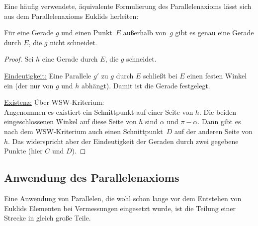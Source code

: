 \bigskip


Eine häufig verwendete, äquivalente Formulierung des Parallelenaxioms 
lässt sich aus dem Parallelenaxioms Euklids herleiten:

\begin{thm}
Für eine Gerade $g$ und einen Punkt~$E$ außerhalb von~$g$ 
gibt es genau eine Gerade durch $E$, die $g$ nicht schneidet.
\end{thm}


\begin{proof}
Sei $h$ eine Gerade durch $E$, die $g$ schneidet. %

\underline{Eindeutigkeit:} Eine Parallele $g'$ zu $g$ durch $E$
schließt bei $E$ einen festen Winkel ein (der nur von $g$ und $h$ abhängt).
Damit ist die Gerade festgelegt.

\underline{Existenz:} Über WSW-Kriterium:\\
Angenommen es existiert ein Schnittpunkt auf einer Seite von $h$.
Die beiden eingeschlossenen Winkel auf diese Seite von $h$ sind $\alpha$ und
$\pi-\alpha$. Dann gibt es nach dem WSW-Kriterium auch einen
Schnittpunkt~$D$ auf der anderen Seite von $h$. Das widerspricht aber der
Eindeutigkeit der Geraden durch zwei gegebene Punkte (hier $C$ und $D$).
\end{proof}






\subsection*{Anwendung des Parallelenaxioms}

Eine Anwendung von Parallelen, die wohl schon lange vor dem Entstehen
von Euklids Elementen bei Vermessungen eingesetzt wurde, ist die 
Teilung einer Strecke in gleich große Teile.


